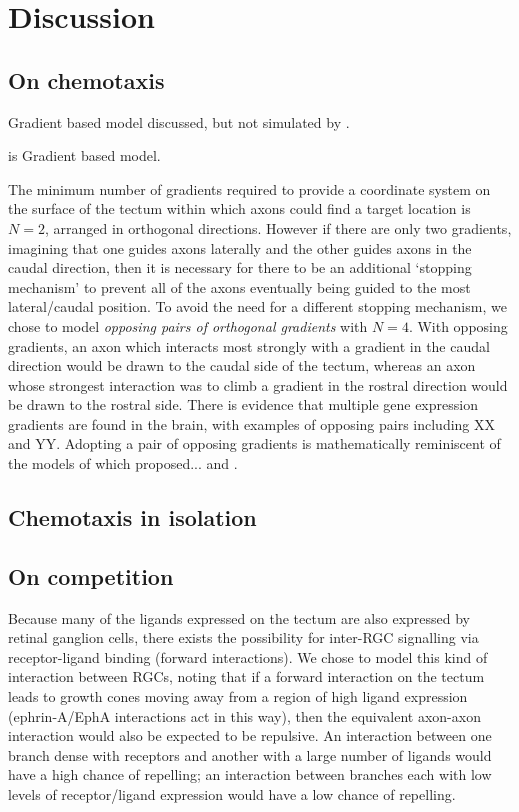 \documentclass[11pt, a4paper]{article}
\begin{document}
\section{Discussion}

\subsection*{On chemotaxis}

Gradient based model discussed, but not simulated by \citet{hope_arrow_1976}.

\citet{nakamoto_topographically_1996} is Gradient based model.

The minimum number of gradients required to provide a coordinate system on the surface of the tectum within which axons could find a target location is $N=2$, arranged in orthogonal directions.
However if there are only two gradients, imagining that one guides axons laterally and the other guides axons in the caudal direction, then it is necessary for there to be an additional `stopping mechanism' to prevent all of the axons eventually being guided to the most lateral/caudal position.
To avoid the need for a different stopping mechanism, we chose to model \emph{opposing pairs of orthogonal gradients} with $N=4$.
With opposing gradients, an axon which interacts most strongly with a gradient in the caudal direction would be drawn to the caudal side of the tectum, whereas an axon whose strongest interaction was to climb a gradient in the rostral direction would be drawn to the rostral side.
There is evidence that multiple gene expression gradients are found in the brain, with examples of opposing pairs including XX and YY.
Adopting a pair of opposing gradients is mathematically reminiscent of the models of \citet{gierer_model_1983} which proposed... and \citet{fraser_differential_1980}.

\subsection*{Chemotaxis in isolation}

\subsection*{On competition}

Because many of the ligands expressed on the tectum are also expressed by retinal ganglion cells, there exists the possibility for inter-RGC signalling via receptor-ligand binding (forward interactions).
We chose to model this kind of interaction between RGCs, noting that if a forward interaction on the tectum leads to growth cones moving away from a region of high ligand expression (ephrin-A/EphA interactions act in this way), then the equivalent axon-axon interaction would also be expected to be repulsive. An interaction between one branch dense with receptors and another with a large number of ligands would have a high chance of repelling; an interaction between branches each with low levels of receptor/ligand expression would have a low chance of repelling.
\end{document}
